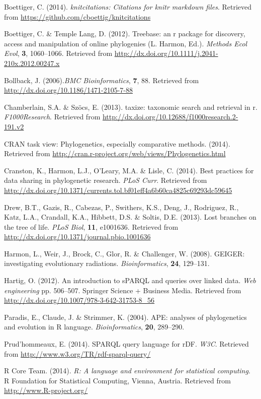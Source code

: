\documentclass[author-year, review, 11pt]{components/elsarticle} %
\begin{document}
Boettiger, C. (2014). \emph{knitcitations: Citations for knitr markdown
files}. Retrieved from \url{https://github.com/cboettig/knitcitations}

Boettiger, C. \& {Temple Lang}, D. (2012). Treebase: an r package for
discovery, access and manipulation of online phylogenies (L. Harmon,
Ed.). \emph{Methods Ecol Evol}, \textbf{3}, 1060--1066. Retrieved from
\url{http://dx.doi.org/10.1111/j.2041-210x.2012.00247.x}

Bollback, J. (2006).\emph{BMC Bioinformatics}, \textbf{7}, 88. Retrieved
from \url{http://dx.doi.org/10.1186/1471-2105-7-88}

Chamberlain, S.A. \& Sz{ö}cs, E. (2013). taxize: taxonomic search and
retrieval in r. \emph{F1000Research}. Retrieved from
\url{http://dx.doi.org/10.12688/f1000research.2-191.v2}

CRAN task view: Phylogenetics, especially comparative methods. (2014).
Retrieved from
\url{http://cran.r-project.org/web/views/Phylogenetics.html}

Cranston, K., Harmon, L.J., O'Leary, M.A. \& Lisle, C. (2014). Best
practices for data sharing in phylogenetic research. \emph{PLoS Curr}.
Retrieved from
\url{http://dx.doi.org/10.1371/currents.tol.bf01eff4a6b60ca4825c69293dc59645}

Drew, B.T., Gazis, R., Cabezas, P., Swithers, K.S., Deng, J., Rodriguez,
R., Katz, L.A., Crandall, K.A., Hibbett, D.S. \& Soltis, D.E. (2013).
Lost branches on the tree of life. \emph{PLoS Biol}, \textbf{11},
e1001636. Retrieved from
\url{http://dx.doi.org/10.1371/journal.pbio.1001636}

Harmon, L., Weir, J., Brock, C., Glor, R. \& Challenger, W. (2008).
GEIGER: investigating evolutionary radiations. \emph{Bioinformatics},
\textbf{24}, 129--131.

Hartig, O. (2012). An introduction to sPARQL and queries over linked
data. \emph{Web engineering} pp. 506--507. Springer Science + Business
Media. Retrieved from
\url{http://dx.doi.org/10.1007/978-3-642-31753-8_56}

Paradis, E., Claude, J. \& Strimmer, K. (2004). APE: analyses of
phylogenetics and evolution in R language. \emph{Bioinformatics},
\textbf{20}, 289--290.

Prud'hommeaux, E. (2014). SPARQL query language for rDF. \emph{W3C}.
Retrieved from \url{http://www.w3.org/TR/rdf-sparql-query/}

R Core Team. (2014). \emph{R: A language and environment for statistical
computing}. R Foundation for Statistical Computing, Vienna, Austria.
Retrieved from \url{http://www.R-project.org/}
\end{document}
